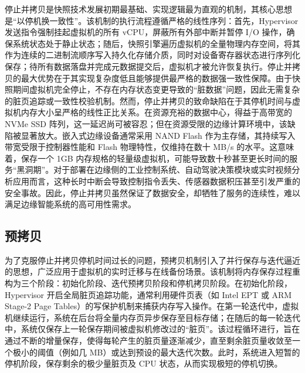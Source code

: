 停止并拷贝是快照技术发展初期最基础、实现逻辑最为直观的机制，其核心思想是“以停机换一致性”\cite{dunlap2002revirt}。该机制的执行流程遵循严格的线性序列：首先，Hypervisor 发送指令强制挂起虚拟机的所有 vCPU，屏蔽所有外部中断并暂停 I/O 操作，确保系统状态处于静止状态；随后，快照引擎遍历虚拟机的全量物理内存空间，将其作为连续的二进制流顺序写入持久化存储介质，同时对设备寄存器状态进行序列化保存；待所有数据落盘并完成元数据提交后，虚拟机才被允许恢复执行。停止并拷贝的最大优势在于其实现复杂度低且能够提供最严格的数据强一致性保障\cite{ta2008virtual}。由于快照期间虚拟机完全停止，不存在内存状态变更导致的“脏数据”问题，因此无需复杂的脏页追踪或一致性校验机制。然而，停止并拷贝的致命缺陷在于其停机时间与虚拟机内存大小呈严格的线性正比关系。在资源充裕的数据中心，得益于高带宽的 NVMe SSD 阵列，这一延迟尚可被容忍；但在资源受限的边缘计算环境中，该缺陷被显著放大\cite{zhong2016flic,heiser2008role}。嵌入式边缘设备通常采用 NAND Flash 作为主存储，其持续写入带宽受限于控制器性能和 Flash 物理特性，仅维持在数十 MB/s 的水平。这意味着，保存一个 1GB 内存规格的轻量级虚拟机，可能导致数十秒甚至更长时间的服务“黑洞期”。对于部署在边缘侧的工业控制系统、自动驾驶决策模块或实时视频分析应用而言，这种长时中断会导致控制指令丢失、传感器数据积压甚至引发严重的安全事故。因此，停止并拷贝虽然保证了数据安全，却牺牲了服务的连续性，难以满足边缘智能系统的高可用性需求\cite{shi2019memory}。


\subsection{预拷贝}

为了克服停止并拷贝停机时间过长的问题，预拷贝机制引入了并行保存与迭代逼近的思想，广泛应用于虚拟机的实时迁移与在线备份场景\cite{clark2005live}。该机制将内存保存过程重构为三个阶段：初始化阶段、迭代预拷贝阶段和停机拷贝阶段。在初始化阶段，Hypervisor 开启全局脏页追踪功能，通常利用硬件页表（如 Intel EPT 或 ARM Stage-2 Page Tables）的写保护机制来捕获内存写入操作\cite{uhlig2005intel}。在第一轮迭代中，虚拟机继续运行，系统在后台将全量内存页异步保存至目标存储；在随后的每一轮迭代中，系统仅保存上一轮保存期间被虚拟机修改过的“脏页”。该过程循环进行，旨在通过不断的增量保存，使得每轮产生的脏页量逐渐减少，直至剩余脏页量收敛至一个极小的阈值（例如几 MB）或达到预设的最大迭代次数。此时，系统进入短暂的停机阶段，保存剩余的极少量脏页及 CPU 状态，从而实现极短的停机切换\cite{hines2009post}。

